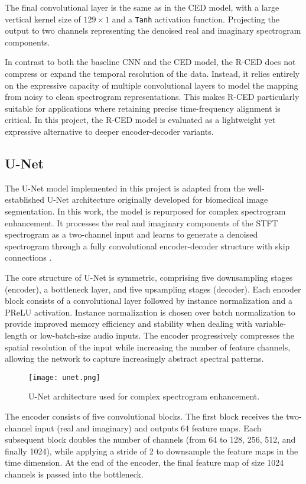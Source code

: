 The final convolutional layer is the same as in the CED model, with a large vertical kernel size of \(129 \times 1\) and a \texttt{Tanh} activation function. Projecting the output to two channels representing the denoised real and imaginary spectrogram components.

In contrast to both the baseline CNN and the CED model, the R-CED does not compress or expand the temporal resolution of the data. Instead, it relies entirely on the expressive capacity of multiple convolutional layers to model the mapping from noisy to clean spectrogram representations. This makes R-CED particularly suitable for applications where retaining precise time-frequency alignment is critical. In this project, the R-CED model is evaluated as a lightweight yet expressive alternative to deeper encoder-decoder variants.

\subsection{U-Net}

The U-Net model implemented in this project is adapted from the well-established U-Net architecture originally developed for biomedical image segmentation. In this work, the model is repurposed for complex spectrogram enhancement. It processes the real and imaginary components of the STFT spectrogram as a two-channel input and learns to generate a denoised spectrogram through a fully convolutional encoder-decoder structure with skip connections \cite{ronneberger2015unet}.

The core structure of U-Net is symmetric, comprising five downsampling stages (encoder), a bottleneck layer, and five upsampling stages (decoder). Each encoder block consists of a convolutional layer followed by instance normalization and a PReLU activation. Instance normalization is chosen over batch normalization to provide improved memory efficiency and stability when dealing with variable-length or low-batch-size audio inputs. The encoder progressively compresses the spatial resolution of the input while increasing the number of feature channels, allowing the network to capture increasingly abstract spectral patterns.

\begin{figure}[h]
    \centering
    \texttt{[image: unet.png]}
    \caption{\label{fig:unet}U-Net architecture used for complex spectrogram enhancement.}
\end{figure}

The encoder consists of five convolutional blocks. The first block receives the two-channel input (real and imaginary) and outputs 64 feature maps. Each subsequent block doubles the number of channels (from 64 to 128, 256, 512, and finally 1024), while applying a stride of 2 to downsample the feature maps in the time dimension. At the end of the encoder, the final feature map of size 1024 channels is passed into the bottleneck.

